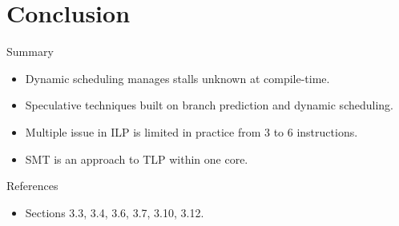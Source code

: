 \section{Conclusion}

\begin{frame}[t]{Summary}
\begin{itemize}[<+->]
  \item Dynamic scheduling manages stalls unknown at compile-time.
  
  \item Speculative techniques built on branch prediction and dynamic scheduling.
  
  \item Multiple issue in ILP is limited in practice from 3 to 6 instructions.
  
  \item SMT is an approach to TLP within one core.
\end{itemize} 
\end{frame}


\begin{frame}[t]{References}
\begin{itemize}
  \item \bibhennessy
  Sections 3.3, 3.4, 3.6, 3.7, 3.10, 3.12.

\end{itemize}
\end{frame}
